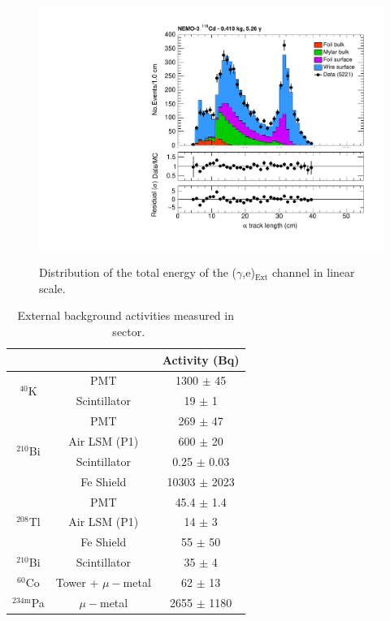 \documentclass[main.tex]{subfiles}
\begin{document}
\begin{figure}[h!]
\centering
\includegraphics[page=3,scale=0.55]{pictures/Chap6/FinalPlots.pdf}
\label{egChannel_Etot}
\caption{Distribution of the total energy of the ($\gamma$,e)$_{\text{Ext}}$ channel in linear scale.}
\end{figure}




\begin{table}
\centering
\begin{tabular}{cc|c}
                                   &              &  Activity (Bq)   \\
\midrule
\multirow{2}{*}{$^{\text{40}}$K}   & PMT          & 1300  $\pm$ 45   \\
                                   & Scintillator & 19    $\pm$ 1    \\
\midrule
\multirow{4}{*}{$^{\text{210}}$Bi} & PMT          & 269   $\pm$ 47   \\
                                   & Air LSM (P1) & 600   $\pm$ 20   \\
                                   & Scintillator & 0.25  $\pm$ 0.03 \\
                                   & Fe Shield    & 10303 $\pm$ 2023 \\
\midrule
\multirow{3}{*}{$^{\text{208}}$Tl} & PMT          & 45.4   $\pm$ 1.4 \\
                                   & Air LSM (P1) & 14     $\pm$ 3   \\
                                   & Fe Shield    & 55     $\pm$ 50  \\
\midrule
$^{\text{210}}$Bi                  & Scintillator & 35     $\pm$ 4  \\
\midrule
$^{\text{60}}$Co                   & Tower + $\mu-$metal & 62 $\pm$ 13  \\
\midrule
$^{\text{234m}}$Pa                 & $\mu-$metal & 2655 $\pm$ 1180  \\
\bottomrule
\end{tabular}
\caption{External background activities measured in \Cd~sector.}
\label{TableOCE-activityMeasurement}
\end{table}
\end{document}
